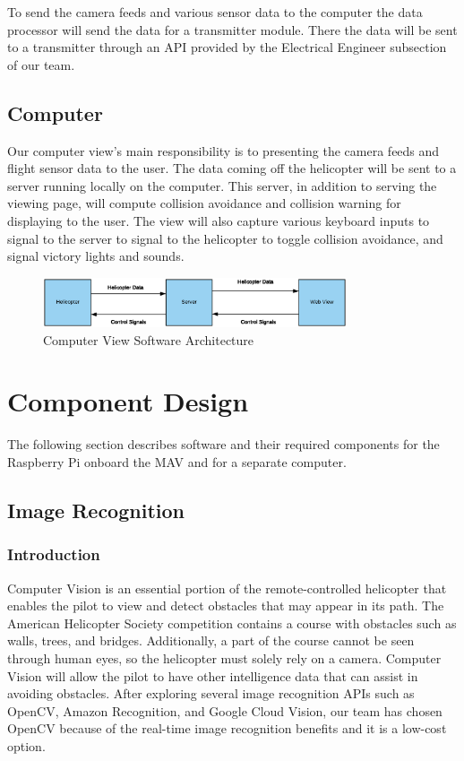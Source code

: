 \documentclass[onecolumn, draftclsnofoot, 10pt, compsoc]{IEEEtran}
\begin{document}
To send the camera feeds and various sensor data to the computer the data processor will send the data for a transmitter module. There the data will be sent to a transmitter through an API provided by the Electrical Engineer subsection of our team.

\subsection{Computer}
Our computer view's main responsibility is to presenting the camera feeds and flight sensor data to the user. The data coming off the helicopter will be sent to a server running locally on the computer. This server, in addition to serving the viewing page, will compute collision avoidance and collision warning for displaying to the user. The view will also capture various keyboard inputs to signal to the server to signal to the helicopter to toggle collision avoidance, and signal victory lights and sounds.

\begin{figure}[h]
    \centering
    \includegraphics[width=0.8\textwidth]{graphics/computer_diagram.eps}
    \caption{Computer View Software Architecture}
    \label{fig:ComputerViewSoftwareArchitecture}
\end{figure}

\section{Component Design}
The following section describes software and their required components for the Raspberry Pi onboard the MAV and for a separate computer.

\subsection{Image Recognition}
\subsubsection{Introduction}
Computer Vision is an essential portion of the remote-controlled helicopter that enables the pilot to view and detect obstacles that may appear in its path. The American Helicopter Society competition contains a course with obstacles such as walls, trees, and bridges. Additionally, a part of the course cannot be seen through human eyes, so the helicopter must solely rely on a camera. Computer Vision will allow the pilot to have other intelligence data that can assist in avoiding obstacles. After exploring several image recognition APIs such as OpenCV, Amazon Recognition, and Google Cloud Vision, our team has chosen OpenCV because of the real-time image recognition benefits and it is a low-cost option.
\end{document}

